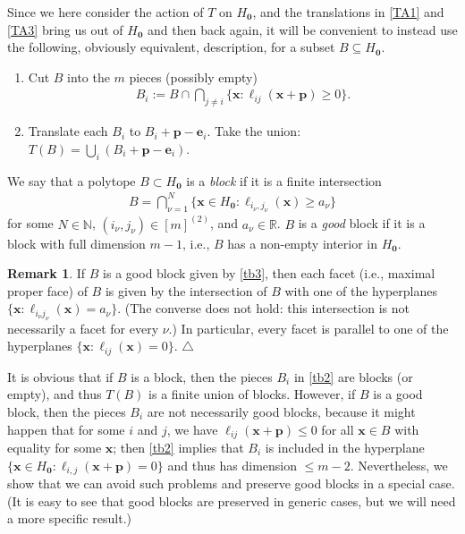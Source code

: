 \documentclass[11pt,reqno,tbtags,a4paper]{amsart}
\numberwithin{equation}{section}
\renewcommand\le{\leq}
\renewcommand\ge{\geq}
\renewcommand\leq{\leqslant}
\renewcommand\geq{\geqslant}
\theoremstyle{plain}%
\theoremstyle{definition}
\newcommand\xqed[1]{%
    \leavevmode\unskip\penalty9999 \hbox{}\nobreak\hfill
    \quad\hbox{#1}}
\newtheorem{remarkqqq}[theorem]{Remark}
\newenvironment{remark}{\begin{remarkqqq}}
  {\xqed{$\triangle$}\end{remarkqqq}}
\theoremstyle{remark}
\newcounter{cases}
\newcommand\set[1]{\ensuremath{\{#1\}}}
\newcommand\bbR{\mathbb R}
\newcommand\bbN{\mathbb N}
\newcommand\Ho{H_{\0}}
\newcommand\ve{\mathbf{e}}
\newcommand\vp{\mathbf{p}}
\newcommand\vx{\mathbf{x}}
\newcommand\mmx{[m]^{(2)}}
\newcommand\0{{\boldsymbol 0}}
\newcommand\1{{\boldsymbol 1}}
\begin{document}
Since we here consider the action of $T$ on $\Ho$, and the translations in 
\ref{TA1} and \ref{TA3} bring us out of $\Ho$ and then back again, it will
be convenient to instead
use the following, obviously equivalent, description, for a
subset $B\subseteq \Ho$.

\begin{enumerate}
 \renewcommand{\labelenumi}{\textup{(B\arabic{enumi})}}%
 \renewcommand{\theenumi}{\labelenumi}%
\item\label{TB2} 
Cut $B$ into the $m$ pieces (possibly empty)
  \begin{align}\label{tb2}
B_i:=B\cap\bigcap_{j\neq i} \set{\vx:\ell_{ij}(\vx+\vp)\ge0}  
.  \end{align}
\item \label{TB3}
Translate each $B_i$ to $B_i+\vp-\ve_i$.
Take the union: $T(B)=\bigcup_i(B_i+\vp-\ve_i)$.
\end{enumerate}


We say that a  polytope  $B\subset\Ho$ is a
\emph{block} 
if it is a finite intersection
\begin{align}\label{tb3}
  B=\bigcap_{\nu=1}^N\set{ \vx\in\Ho:\ell_{i_\nu,j_\nu}(\vx)\ge a_\nu}
\end{align}
for some $N\in\bbN$,  $(i_\nu,j_\nu)\in\mmx$, and $a_\nu\in\bbR$.
$B$ is a \emph{good} block if it is a block with full dimension $m-1$,
i.e., $B$ has a non-empty interior  in $\Ho$.

\begin{remark}
 If $B$ is a good block given by \eqref{tb3}, then each facet
(i.e., maximal proper face) of $B$ is given by the intersection of $B$ 
with one 
of the hyperplanes $\set{\vx:\ell_{i_\nu j_\nu}(\vx)=a_\nu}$. 
(The converse does not hold:  
this intersection is not necessarily a facet for every $\nu$.)
In particular, every
facet is parallel to one of the hyperplanes 
$\set{\vx:\ell_{ij}(\vx)=0}$.  
\end{remark}


It is obvious that if $B$ is a block, then the pieces $B_i$ in \eqref{tb2}
are blocks (or empty), and thus $T(B)$ is a finite union of blocks.
However, if $B$ is a good block, then the pieces $B_i$ are not necessarily good
blocks, because it might happen that for some $i$ and $j$, we have
$\ell_{ij}(\vx+\vp)\le 0$ for all $\vx\in B$ with equality for some
$\vx$; then \eqref{tb2} implies that $B_i$ is included in the hyperplane
$\set{ \vx\in\Ho:\ell_{i,j}(\vx+\vp)=0}$ 
and thus has dimension $\le m-2$.
Nevertheless, we show that we can avoid such problems and preserve good
blocks in a special case. (It is easy to see that good blocks are preserved
in generic cases, but we will need a more specific result.)
\end{document}

